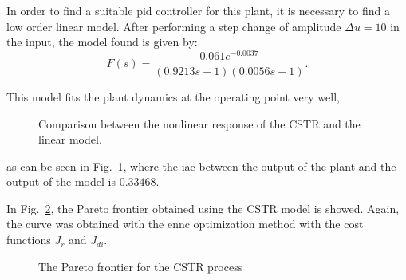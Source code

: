 In order to find a suitable \gls{pid} controller for this plant, it is necessary to find a low order linear model. After performing a step change of amplitude $\Delta u=10$ in the input, the model found is given by:
%
\begin{equation}
F(s)=\frac{0.061 e^{-0.0037}}{(0.9213 s +1)(0.0056s+1)}.
\label{eq:FTCSTR}
\end{equation}

This model fits the plant dynamics at the operating point very well, %
\begin{figure}%
	\centering
	\caption{Comparison between the nonlinear response of the CSTR and the linear model.}%
	\label{fig:CSTR_TFfit}%
\end{figure}
%
as can be seen in Fig.~\ref{fig:CSTR_TFfit}, where the \gls{iae} between the output of the plant and the output of the model is $0.33468$.

In Fig.~\ref{fig:paretoCSTR}, the Pareto frontier obtained using the CSTR model is showed. Again, the curve was obtained with the \gls{ennc} optimization method with the cost functions $J_r$ and $J_{di}$.  

\begin{figure}%
	\centering
	\caption{The Pareto frontier for the CSTR process}%
	\label{fig:paretoCSTR}%
\end{figure}

